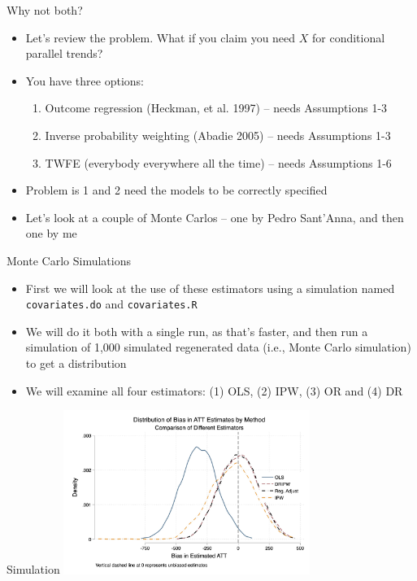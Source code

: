\documentclass{beamer}
\begin{document}
\begin{frame}{Why not both?}

\begin{itemize}
\item Let's review the problem.  What if you claim you need $X$ for conditional parallel trends?
\item You have three options:
	\begin{enumerate}
	\item Outcome regression (Heckman, et al. 1997) -- needs Assumptions 1-3
	\item Inverse probability weighting (Abadie 2005) -- needs Assumptions 1-3
	\item TWFE (everybody everywhere all the time) -- needs Assumptions 1-6
	\end{enumerate}
\item Problem is 1 and 2 need the models to be correctly specified
\item Let's look at a couple of Monte Carlos -- one by Pedro Sant'Anna, and then one by me
\end{itemize}

\end{frame}








\begin{frame}{Monte Carlo Simulations}

\begin{itemize}

\item First we will look at the use of these estimators using a simulation named \texttt{covariates.do} and \texttt{covariates.R}

\item We will do it both with a single run, as that's faster, and then run a simulation of 1,000 simulated regenerated data (i.e., Monte Carlo simulation) to get a distribution

\item We will examine all four estimators: (1) OLS, (2) IPW, (3) OR and (4) DR

\end{itemize}

\end{frame}

\begin{frame}{Simulation}
    \centering
    \includegraphics[width=0.6\textwidth]{./lecture_includes/covariates.jpg}
\end{frame}
\end{document}
